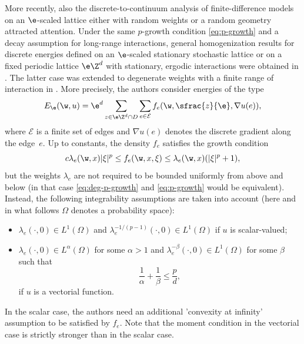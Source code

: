 More recently, also the discrete-to-continuum analysis of finite-difference models on an $\e$-scaled lattice either with random weights or a random geometry attracted attention. Under the same $p$-growth condition \eqref{eq:p-growth} and a decay assumption for long-range interactions, general homogenization results for discrete energies defined on an $\e$-scaled stationary stochastic lattice or on a fixed periodic lattice $\e\Z^d$ with stationary, ergodic interactions were obtained in \cite{ACG2}. The latter case was extended to degenerate weights with a finite range of interaction in \cite{NSS}. More precisely, the authors consider energies of the type
\begin{equation*}
E_{\e}(\w,u)=\e^d\sum_{z\in \e\Z^d\cap D}\sum_{e\in \mathcal{E}}f_e(\w,\sfrac{z}{\e},\nabla u(e)),
\end{equation*}
where $\mathcal{E}$ is a finite set of edges and $\nabla u(e)$ denotes the discrete gradient along the edge~$e$. Up to constants, the density $f_e$ satisfies the growth condition
\begin{equation}\label{eq:deg-p-growth}
c\lambda_e(\w,x)|\xi|^p\leq f_e(\w,x,\xi)\leq \lambda_e(\w,x)(|\xi|^p+1),
\end{equation}
but the weights $\lambda_e$ are not required to be bounded uniformly from above and below (in that case \eqref{eq:deg-p-growth} and \eqref{eq:p-growth} would be equivalent). Instead, the following integrability assumptions are taken into account (here and in what follows $\Omega$ denotes a probability space):
\begin{itemize}
\item $\lambda_e(\cdot,0) \in L^1(\Omega)$ and $\lambda_e^{-1/(p-1)}(\cdot,0)\in L^{1}(\Omega)$ if $u$ is scalar-valued;
\item $\lambda_e(\cdot,0) \in L^{\alpha}(\Omega)$ for some $\alpha>1$ and $\lambda_e^{-\beta}(\cdot,0)\in L^{1}(\Omega)$ for some $\beta$ such that
\begin{equation}\label{eq:moment_vectorial}
\frac{1}{\alpha}+\frac{1}{\beta}\leq\frac{p}{d},
\end{equation}
if $u$ is a vectorial function.
\end{itemize}
In the scalar case, the authors need an additional 'convexity at infinity' assumption to be satisfied by $f_{e}$. Note that the moment condition in the vectorial case is strictly stronger than in the scalar case.

